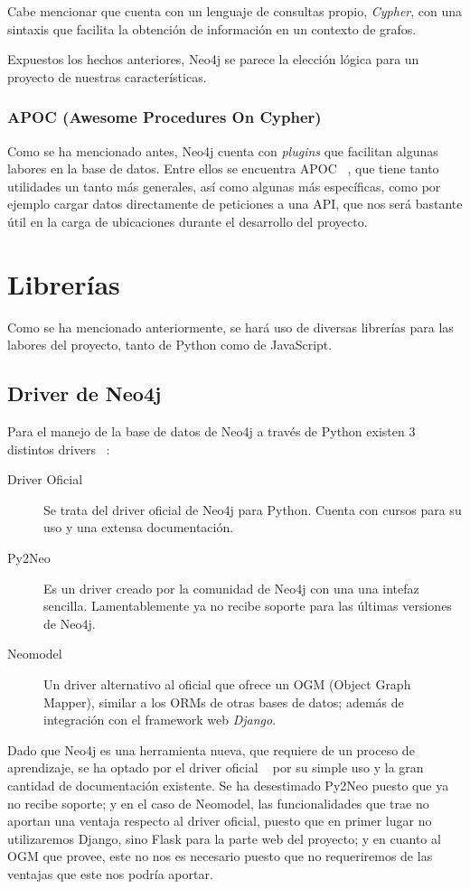 Cabe mencionar 
que cuenta con un lenguaje de consultas propio, \textit{Cypher}, con una sintaxis que 
facilita la obtención de información en un contexto de grafos.

Expuestos los hechos anteriores, Neo4j se parece la elección lógica para un proyecto de nuestras 
características.

\subsubsection{APOC (Awesome Procedures On Cypher)}
Como se ha mencionado antes, Neo4j cuenta con \textit{plugins} que facilitan algunas labores
en la base de datos. Entre ellos se encuentra APOC ~\cite{APOC}, que tiene tanto utilidades un tanto más generales,
así como algunas más específicas, como por ejemplo cargar datos directamente de peticiones a una API, que nos
será bastante útil en la carga de ubicaciones durante el desarrollo del proyecto.

\section{Librerías}
Como se ha mencionado anteriormente, se hará uso de diversas librerías para las labores del proyecto,
tanto de Python como de JavaScript.
\subsection{Driver de Neo4j}
Para el manejo de la base de datos de Neo4j a través de Python existen 3 distintos drivers ~\cite{neo4jpythonDrivers}:

\begin{description}
    \item [Driver Oficial] Se trata del driver oficial de Neo4j para Python. Cuenta con cursos para su uso y una extensa documentación.
    \item [Py2Neo] Es un driver creado por la comunidad de Neo4j con una una intefaz sencilla. Lamentablemente ya no recibe soporte para las últimas versiones de Neo4j.
    \item [Neomodel] Un driver alternativo al oficial que ofrece un OGM (Object Graph Mapper), similar a los ORMs de otras bases de datos; además de integración con el framework web \textit{Django}.
\end{description}

Dado que Neo4j es una herramienta nueva, que requiere de un proceso de aprendizaje, se ha optado
por el driver oficial ~\cite{neo4jdriver} por su simple uso y la gran cantidad de documentación existente. Se ha desestimado Py2Neo
puesto que ya no recibe soporte; y en el caso de Neomodel, las funcionalidades que trae no aportan una ventaja
respecto al driver oficial, puesto que en primer lugar no utilizaremos Django, sino Flask para la parte web del proyecto;
y en cuanto al OGM que provee, este no nos es necesario puesto que no requeriremos de las ventajas que este nos podría aportar.

